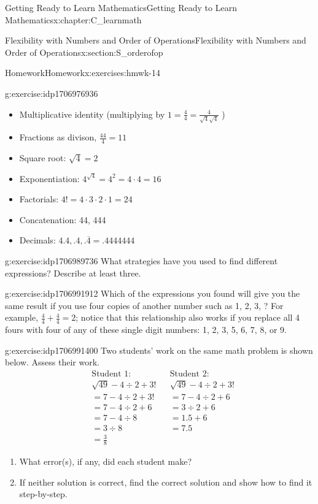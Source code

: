 \documentclass[oneside,10pt,]{book}
\numberwithin{equation}{chapter}
\newcommand{\amp}{&}
\begin{document}
\begin{chapterptx}{Getting Ready to Learn Mathematics}{}{Getting Ready to Learn Mathematics}{}{}{x:chapter:C_learnmath}
\begin{sectionptx}{Flexibility with Numbers and Order of Operations}{}{Flexibility with Numbers and Order of Operations}{}{}{x:section:S_orderofop}
\begin{exercises-subsection}{Homework}{}{Homework}{}{}{x:exercises:hmwk-14}
\begin{divisionexercise}{5}{}{}{g:exercise:idp1706976936}
\begin{itemize}[label=\textbullet]
\item{}Multiplicative identity (multiplying by \(1= \frac{4}{4}=\frac{4}{\sqrt4\sqrt4}\) )%
\item{}Fractions as divison, \(\frac{44}{4} = 11\)%
\item{}Square root: \(\sqrt{4} = 2\)%
\item{}Exponentiation: \(4^{\sqrt4}=4^2=4 \cdot 4=16\)%
\item{}Factorials: \(4! = 4 \cdot 3 \cdot 2 \cdot 1 = 24\)%
\item{}Concatenation: 44, 444%
\item{}Decimals: \(4.4, .4, . \overline{4} = .4444444\) \textellipsis{}%
\end{itemize}
%
\end{divisionexercise}%
\begin{divisionexercise}{6}{}{}{g:exercise:idp1706989736}%
What strategies have you used to find different expressions? Describe at least three.%
\end{divisionexercise}%
\begin{divisionexercise}{7}{}{}{g:exercise:idp1706991912}%
Which of the expressions you found will give you the same result if you use four copies of another number such as 1, 2, 3, \textellipsis{}? For example, \(\frac{4}{4}+\frac{4}{4}=2\); notice that this relationship also works if you replace all 4 fours with four of any of these single digit numbers: 1, 2, 3, 5, 6, 7, 8, or 9.%
\end{divisionexercise}%
\begin{divisionexercise}{8}{}{}{g:exercise:idp1706991400}%
Two students' work on the same math problem is shown below. Assess their work.%
\begin{align*}
\amp \text{Student 1:} \amp \amp \text{Student 2:}\\
\amp \sqrt{49} - 4 \div 2 + 3! \amp \amp \sqrt{49} - 4 \div 2 + 3!\\
\amp = 7 - 4 \div 2 + 3! \amp \amp = 7 - 4 \div 2 + 6\\
\amp = 7 - 4 \div 2 + 6 \amp \amp = 3 \div 2 +6\\
\amp = 7 - 4 \div 8 \amp \amp = 1.5 + 6\\
\amp = 3 \div 8 \amp \amp = 7.5\\
\amp = \frac{3}{8} \amp \amp
\end{align*}
%
\begin{enumerate}[font=\bfseries,label=(\alph*),ref=\alph*]
\item{}What error(s), if any, did each student make?%
\item{}If neither solution is correct, find the correct solution and show how to find it step-by-step.%

\end{enumerate}
\end{divisionexercise}
\end{exercises-subsection}
\end{sectionptx}
\end{chapterptx}
\end{document}
